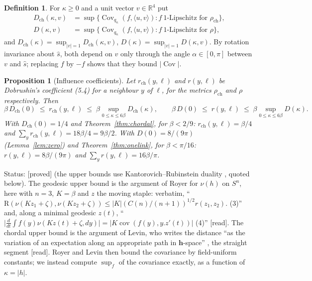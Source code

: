 \documentclass[11pt,a4paper]{article}
\newtheorem{proposition}[theorem]{Proposition}
\theoremstyle{remark}
\theoremstyle{definition}
\newtheorem{definition}[theorem]{Definition}
\newcommand{\R}{\mathbb{R}}
\newcommand{\Cov}{\operatorname{Cov}}
\newcommand{\st}[1]{\textsf{[#1]}}
\newcommand{\Dch}{D_{\mathrm{ch}}}
\newcommand{\rch}{\rho_{\mathrm{ch}}}
\begin{document}
\begin{definition}\label{def:D}
For $\kappa\ge0$ and a unit vector $v\in\R^4$ put
\begin{align*}
\Dch(\kappa,v)&=\sup\{\Cov_{q_\kappa}(f,\langle u,v\rangle): f\ \text{1-Lipschitz for }\rch\},\\
D(\kappa,v)&=\sup\{\Cov_{q_\kappa}(f,\langle u,v\rangle): f\ \text{1-Lipschitz for }\rho\},
\end{align*}
and $\Dch(\kappa)=\sup_{|v|=1}\Dch(\kappa,v)$, $D(\kappa)=\sup_{|v|=1}D(\kappa,v)$.
By rotation invariance about $\hat s$, both depend on $v$ only through the angle $\alpha\in[0,\pi]$ between
$v$ and $\hat s$; replacing $f$ by $-f$ shows that they bound $|\Cov|$.
\end{definition}

\begin{proposition}[Influence coefficients]\label{prop:influence}
Let $r_{\mathrm{ch}}(y,\ell)$ and $r(y,\ell)$ be Dobrushin's coefficient (5.4) for a neighbour $y$ of $\ell$, for the
metrics $\rch$ and $\rho$ respectively. Then
\[
  \beta\,\Dch(0)\;\le\;r_{\mathrm{ch}}(y,\ell)\;\le\;\beta\sup_{0\le\kappa\le6\beta}\Dch(\kappa),\qquad
  \beta\,D(0)\;\le\;r(y,\ell)\;\le\;\beta\sup_{0\le\kappa\le6\beta}D(\kappa).
\]
With $\Dch(0)=1/4$ and Theorem~\ref{thm:chordal}, for $\beta<2/9$: $r_{\mathrm{ch}}(y,\ell)=\beta/4$ and
$\sum_y r_{\mathrm{ch}}(y,\ell)=18\beta/4=9\beta/2$. With $D(0)=8/(9\pi)$ (Lemma~\ref{lem:zero}) and
Theorem~\ref{thm:onelink}, for $\beta<\pi/16$: $r(y,\ell)=8\beta/(9\pi)$ and $\sum_y r(y,\ell)=16\beta/\pi$.
\end{proposition}
\noindent Status: \st{proved} (the upper bounds use Kantorovich--Rubinstein duality \cite[Thm~10.8]{DS25},
quoted below). The geodesic upper bound is the argument of Royer \cite[(3)--(4), p.~31]{Roy86} for $\nu(h)$ on $S^n$,
here with $n=3$, $K=\beta$ and $z$ the moving staple: verbatim, ``$\mathrm R(\nu(Kz_1+\zeta),\nu(Kz_2+\zeta))
\leqslant|K|(C(n)/(n+1))^{1/2}r(z_1,z_2)$. (3)'' and, along a minimal geodesic $z(t)$,
``$\big|\frac{d}{dt}\int f(y)\nu(Kz(t)+\zeta,dy)\big|=|K\operatorname{cov}(f(y),y.z'(t))|$ (4)'' \st{read}.
The chordal upper bound is the argument of Levin, who writes the distance ``as the variation of an expectation
along an appropriate path in $\mathbf h$-space'' \cite[p.~68]{Lev80}, the straight segment
\cite[(3.35), p.~71]{Lev80} \st{read}.
Royer and Levin then bound the covariance by field-uniform constants; we instead compute $\sup_f$ of the
covariance exactly, as a function of $\kappa=|h|$.
\end{document}
